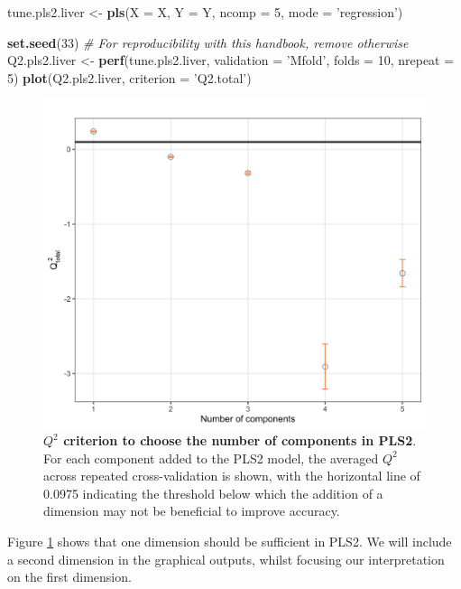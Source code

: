 \documentclass[]{book}
\newenvironment{Shaded}{\begin{snugshade}}{\end{snugshade}}
\newcommand{\KeywordTok}[1]{\textcolor[rgb]{0.13,0.29,0.53}{\textbf{#1}}}
\newcommand{\DataTypeTok}[1]{\textcolor[rgb]{0.13,0.29,0.53}{#1}}
\newcommand{\DecValTok}[1]{\textcolor[rgb]{0.00,0.00,0.81}{#1}}
\newcommand{\StringTok}[1]{\textcolor[rgb]{0.31,0.60,0.02}{#1}}
\newcommand{\CommentTok}[1]{\textcolor[rgb]{0.56,0.35,0.01}{\textit{#1}}}
\newcommand{\NormalTok}[1]{#1}
\begin{document}
\begin{Shaded}
\begin{Highlighting}[]
\NormalTok{tune.pls2.liver <-}\StringTok{ }\KeywordTok{pls}\NormalTok{(}\DataTypeTok{X =}\NormalTok{ X, }\DataTypeTok{Y =}\NormalTok{ Y, }\DataTypeTok{ncomp =} \DecValTok{5}\NormalTok{, }\DataTypeTok{mode =} \StringTok{'regression'}\NormalTok{)}

\KeywordTok{set.seed}\NormalTok{(}\DecValTok{33}\NormalTok{)  }\CommentTok{# For reproducibility with this handbook, remove otherwise}
\NormalTok{Q2.pls2.liver <-}\StringTok{ }\KeywordTok{perf}\NormalTok{(tune.pls2.liver, }\DataTypeTok{validation =} \StringTok{'Mfold'}\NormalTok{, }\DataTypeTok{folds =} \DecValTok{10}\NormalTok{, }
                      \DataTypeTok{nrepeat =} \DecValTok{5}\NormalTok{)}
\KeywordTok{plot}\NormalTok{(Q2.pls2.liver, }\DataTypeTok{criterion =} \StringTok{'Q2.total'}\NormalTok{)}
\end{Highlighting}
\end{Shaded}

\begin{figure}

{\centering \includegraphics[width=0.5\linewidth]{Figures/PLS/pls2-Q2-1} 

}

\caption{\textbf{\(Q^2\) criterion to choose the number of
components in PLS2}. For each component added to the PLS2 model, the
averaged \(Q^2\) across repeated cross-validation is shown, with the
horizontal line of 0.0975 indicating the threshold below which the
addition of a dimension may not be beneficial to improve accuracy.}\label{fig:pls2-Q2}
\end{figure}







Figure \ref{fig:pls2-Q2} shows that one dimension should be sufficient
in PLS2. We will include a second dimension in the graphical outputs,
whilst focusing our interpretation on the first dimension.
\end{document}
